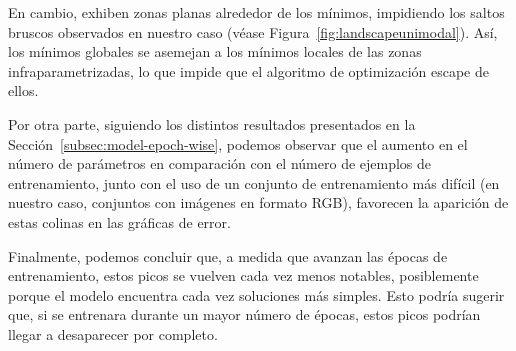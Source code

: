 En cambio, exhiben zonas planas alrededor de los mínimos, impidiendo los saltos bruscos observados en nuestro caso (véase Figura~\ref{fig:landscapeunimodal}). Así, los mínimos globales se asemejan a los mínimos locales de las zonas infraparametrizadas, lo que impide que el algoritmo de optimización escape de ellos.\newline

Por otra parte, siguiendo los distintos resultados presentados en la Sección~\ref{subsec:model-epoch-wise}, podemos observar que el aumento en el número de parámetros en comparación con el número de ejemplos de entrenamiento, junto con el uso de un conjunto de entrenamiento más difícil (en nuestro caso, conjuntos con imágenes en formato RGB), favorecen la aparición de estas colinas en las gráficas de error.\newline

Finalmente, podemos concluir que, a medida que avanzan las épocas de entrenamiento, estos picos se vuelven cada vez menos notables, posiblemente porque el modelo encuentra cada vez soluciones más simples. Esto podría sugerir que, si se entrenara durante un mayor número de épocas, estos picos podrían llegar a desaparecer por completo.\newline

\endinput
